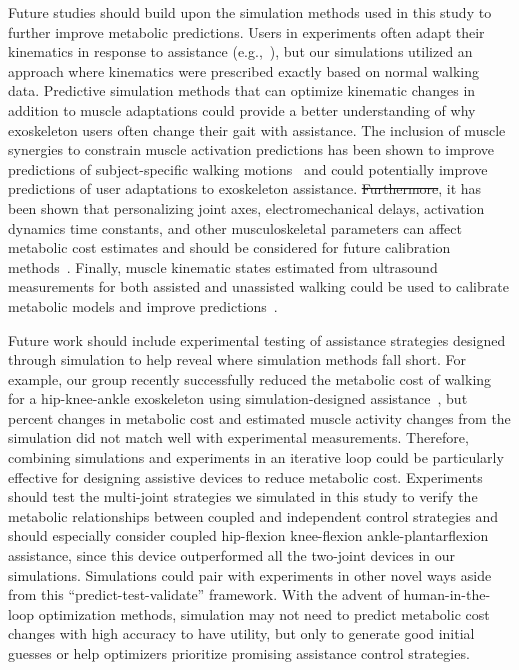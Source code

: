\documentclass[10pt,letterpaper]{article}
\providecommand{\DIFaddtex}[1]{{\protect\color{blue}{#1}}} %
\providecommand{\DIFdeltex}[1]{{\protect\color{red}\sout{#1}}}                      %
\providecommand{\DIFaddbegin}{} %
\providecommand{\DIFaddend}{} %
\providecommand{\DIFdelbegin}{} %
\providecommand{\DIFdelend}{} %
\providecommand{\DIFadd}[1]{\texorpdfstring{\DIFaddtex{#1}}{#1}} %
\providecommand{\DIFdel}[1]{\texorpdfstring{\DIFdeltex{#1}}{}} %
\newcommand{\DIFscaledelfig}{0.5}
\newlength{\DIFdelgraphicswidth} %
\newlength{\DIFdelgraphicsheight} %
\newcommand{\DIFaddincludegraphics}[2][]{{\color{blue}\fbox{\DIFOincludegraphics[#1]{#2}}}} %
\newcommand{\DIFdelincludegraphics}[2][]{%
\sbox{\DIFdelgraphicsbox}{\DIFOincludegraphics[#1]{#2}}%
\settoboxwidth{\DIFdelgraphicswidth}{\DIFdelgraphicsbox} %
\settoboxtotalheight{\DIFdelgraphicsheight}{\DIFdelgraphicsbox} %
\scalebox{\DIFscaledelfig}{%
\parbox[b]{\DIFdelgraphicswidth}{\usebox{\DIFdelgraphicsbox}\\[-\baselineskip] \rule{\DIFdelgraphicswidth}{0em}}\llap{\resizebox{\DIFdelgraphicswidth}{\DIFdelgraphicsheight}{%
\setlength{\unitlength}{\DIFdelgraphicswidth}%
\begin{picture}(1,1)%
\thicklines\linethickness{2pt} %
{\color[rgb]{1,0,0}\put(0,0){\framebox(1,1){}}}%
{\color[rgb]{1,0,0}\put(0,0){\line( 1,1){1}}}%
{\color[rgb]{1,0,0}\put(0,1){\line(1,-1){1}}}%
\end{picture}%
}*{3pt}}} %
} %
\DeclareRobustCommand{\DIFaddbegin}{\DIFOaddbegin \let\includegraphics\DIFaddincludegraphics} %
\DeclareRobustCommand{\DIFaddend}{\DIFOaddend \let\includegraphics\DIFOincludegraphics} %
\DeclareRobustCommand{\DIFdelbegin}{\DIFOdelbegin \let\includegraphics\DIFdelincludegraphics} %
\DeclareRobustCommand{\DIFdelend}{\DIFOaddend \let\includegraphics\DIFOincludegraphics} %
\begin{document}
Future studies should build upon the simulation methods used in this study to further improve metabolic predictions. Users in experiments often adapt their kinematics in response to assistance (e.g.,~\cite{Gordon:2018, Collins:2015, Quinlivan:2017, Lee:2017, Panizzolo:2016, Jackson:2015, Galle:2017, Koller:2015}), but our simulations utilized an approach where kinematics were prescribed exactly based on normal walking data. \DIFaddbegin \DIFadd{Devices may cause different changes in walking kinematics depending on which joints were assisted and the torque or power applied to the user. Therefore, the metabolic cost trends we observed in our simulations could differ depending on the magnitude of kinematic adaptations between single and multi-joint devices. }\DIFaddend Predictive simulation methods that can optimize kinematic changes in addition to muscle adaptations could provide a better understanding of why exoskeleton users often change their gait with assistance. The inclusion of muscle synergies to constrain muscle activation predictions has been shown to improve predictions of subject-specific walking motions~\cite{Meyer:2016} and could potentially improve predictions of user adaptations to exoskeleton assistance. \DIFdelbegin \DIFdel{Furthermore}\DIFdelend \DIFaddbegin \DIFadd{In addition}\DIFaddend , it has been shown that personalizing joint axes, electromechanical delays, activation dynamics time constants, and other musculoskeletal  parameters can affect metabolic cost estimates and should be considered for future calibration methods~\cite{Arones:2020}. Finally, muscle kinematic states estimated from ultrasound measurements for both assisted and unassisted walking could be used to calibrate metabolic models and improve predictions~\cite{Nuckols:2020}.

Future work should include experimental testing of assistance strategies designed through simulation to help reveal where simulation methods fall short. For example, our group recently successfully reduced the metabolic cost of walking for a hip-knee-ankle exoskeleton using simulation-designed assistance~\cite{Franks:2020}, but percent changes in metabolic cost and estimated muscle activity changes from the simulation did not match well with experimental measurements. Therefore, combining simulations and experiments in an iterative loop could be particularly effective for designing assistive devices to reduce metabolic cost. Experiments should test the multi-joint strategies we simulated in this study to verify the metabolic relationships between coupled and independent control strategies and should especially consider coupled hip-flexion knee-flexion ankle-plantarflexion assistance, since this device outperformed all the two-joint devices in our simulations. Simulations could pair with experiments in other novel ways aside from this ``predict-test-validate'' framework. With the advent of human-in-the-loop optimization methods, simulation may not need to predict metabolic cost changes with high accuracy to have utility, but only to generate good initial guesses or help optimizers prioritize promising assistance control strategies.
\end{document}
